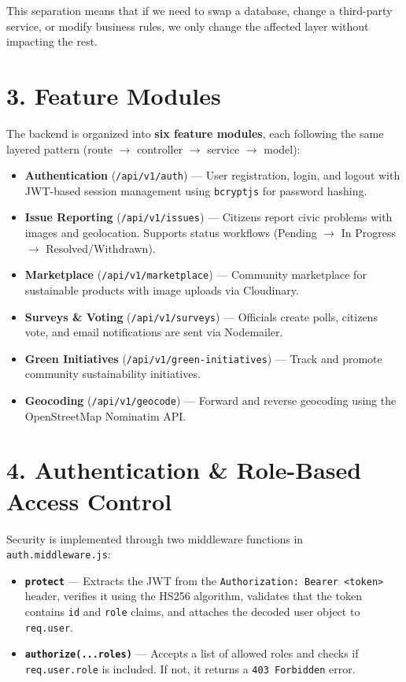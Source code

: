 \documentclass[12pt,a4paper]{article}
\begin{document}
This separation means that if we need to swap a database, change a third-party service, or modify business rules, we only change the affected layer without impacting the rest.

\section{3. Feature Modules}

The backend is organized into \textbf{six feature modules}, each following the same layered pattern (route $\rightarrow$ controller $\rightarrow$ service $\rightarrow$ model):

\begin{itemize}[nosep]
    \item \textbf{Authentication} (\texttt{/api/v1/auth}) --- User registration, login, and logout with JWT-based session management using \texttt{bcryptjs} for password hashing.
    \item \textbf{Issue Reporting} (\texttt{/api/v1/issues}) --- Citizens report civic problems with images and geolocation. Supports status workflows (Pending $\rightarrow$ In Progress $\rightarrow$ Resolved/Withdrawn).
    \item \textbf{Marketplace} (\texttt{/api/v1/marketplace}) --- Community marketplace for sustainable products with image uploads via Cloudinary.
    \item \textbf{Surveys \& Voting} (\texttt{/api/v1/surveys}) --- Officials create polls, citizens vote, and email notifications are sent via Nodemailer.
    \item \textbf{Green Initiatives} (\texttt{/api/v1/green-initiatives}) --- Track and promote community sustainability initiatives.
    \item \textbf{Geocoding} (\texttt{/api/v1/geocode}) --- Forward and reverse geocoding using the OpenStreetMap Nominatim API.
\end{itemize}

\section{4. Authentication \& Role-Based Access Control}

Security is implemented through two middleware functions in \texttt{auth.middleware.js}:

\begin{itemize}[nosep]
    \item \textbf{\texttt{protect}} --- Extracts the JWT from the \texttt{Authorization: Bearer <token>} header, verifies it using the HS256 algorithm, validates that the token contains \texttt{id} and \texttt{role} claims, and attaches the decoded user object to \texttt{req.user}.
    \item \textbf{\texttt{authorize(...roles)}} --- Accepts a list of allowed roles and checks if \texttt{req.user.role} is included. If not, it returns a \texttt{403 Forbidden} error.
\end{itemize}
\end{document}
